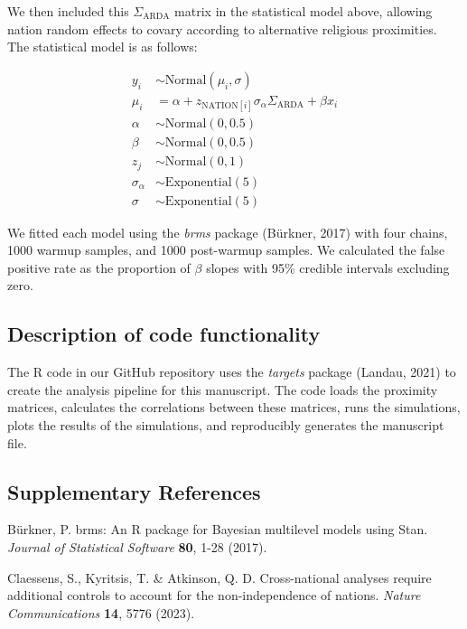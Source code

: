 We then included this $\Sigma_\text{ARDA}$ matrix in the statistical model 
above, allowing nation random effects to covary according to alternative
religious proximities. The statistical model is as follows:

\begin{align}
y_{i} &\sim \text{Normal}(\mu_{i},\sigma) \nonumber \\
\mu_{i} &= \alpha + z_{\text{NATION}[i]}\sigma_{\alpha}\Sigma_\text{ARDA} + 
\beta x_{i} \nonumber \\
\alpha &\sim \text{Normal}(0, 0.5) \nonumber \\
\beta &\sim \text{Normal}(0, 0.5) \nonumber \\
z_{j} &\sim \text{Normal}(0, 1) \nonumber \\
\sigma_{\alpha} &\sim \text{Exponential}(5) \nonumber \\
\sigma &\sim \text{Exponential}(5) \nonumber
\end{align}

We fitted each model using the \textit{brms} package (Bürkner, 2017) with four 
chains, 1000 warmup samples, and 1000 post-warmup samples. We calculated the 
false positive rate as the proportion of $\beta$ slopes with 95\% credible 
intervals excluding zero.

\subsection*{Description of code functionality}

The R code in our GitHub repository uses the \textit{targets} package
(Landau, 2021) to create the analysis pipeline for this manuscript. The code 
loads the proximity matrices, calculates the correlations between these
matrices, runs the simulations, plots the results of the simulations, and
reproducibly generates the manuscript file.

\subsection*{Supplementary References}

Bürkner, P. brms: An R package for Bayesian multilevel models using Stan. 
\textit{Journal of Statistical Software} \textbf{80}, 1-28 (2017).

Claessens, S., Kyritsis, T. \& Atkinson, Q. D. Cross-national analyses require 
additional controls to account for the non-independence of nations.
\textit{Nature Communications} \textbf{14}, 5776 (2023).

